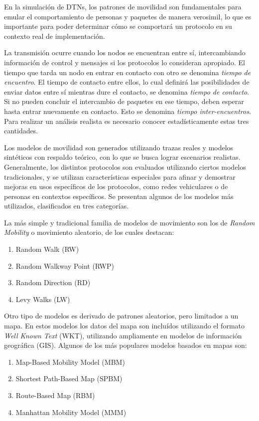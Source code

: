 En la simulación de DTNs, los patrones de movilidad son fundamentales para emular el comportamiento de personas y paquetes de manera verosimil, lo que es importante para poder determinar cómo se comportará un protocolo en su contexto real de implementación.

La transmisión ocurre cuando los nodos se encuentran entre sí, intercambiando información de control y mensajes si los protocolos lo consideran apropiado. El tiempo que tarda un nodo en entrar en contacto con otro se denomina \emph{tiempo de encuentro}. El tiempo de contacto entre ellos, lo cual definirá las posibilidades de enviar datos entre sí mientras dure el contacto, se denomina \emph{tiempo de contacto}. Si no pueden concluir el intercambio de paquetes en ese tiempo, deben esperar hasta entrar nuevamente en contacto. Esto se denomina \emph{tiempo inter-encuentros}. Para realizar un análisis realista es necesario conocer estadísticamente estas tres cantidades. 

Los modelos de movilidad son generados utilizando trazas reales y modelos sintéticos con respaldo teórico, con lo que se busca lograr escenarios realistas. Generalmente, los distintos protocolos son evaluados utilizando ciertos modelos tradicionales, y se utilizan características especiales para afinar y demostrar mejoras en usos específicos de los protocolos, como redes vehiculares o de personas en contextos específicos. Se presentan algunos de los modelos más utilizados, clasificados en tres categorías.

La más simple y tradicional familia de modelos de movimiento son los de \emph{Random Mobility} o movimiento aleatorio, de los cuales destacan:

\begin{enumerate}
	\item Random Walk (RW)
	\item Random Walkway Point (RWP) 
	\item Random Direction (RD)
	\item Levy Walks (LW) 
\end{enumerate}

Otro tipo de modelos es derivado de patrones aleatorios, pero limitados a un mapa. En estos modelos los datos del mapa son incluídos utilizando el formato \emph{Well Known Text} (WKT), utilizando ampliamente en modelos de información geográfica (GIS). Algunos de los más populares modelos basados en mapas son:

\begin{enumerate}
	\item Map-Based Mobility Model (MBM)
	\item Shortest Path-Based Map (SPBM)
	\item Route-Based Map (RBM)
	\item Manhattan Mobility Model (MMM)
\end{enumerate}

